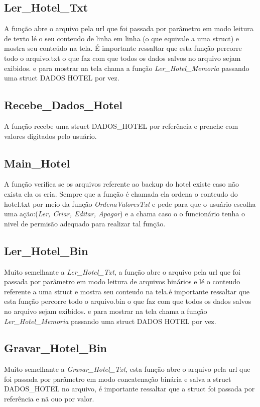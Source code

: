 \documentclass{article}
\begin{document}
\subsection{Ler\_Hotel\_Txt}
	A função abre o arquivo pela url que foi passada por parâmetro em modo leitura de texto lé o seu conteudo de linha em linha (o que equivale a uma struct) e mostra seu conteúdo na tela. É importante ressaltar que esta função percorre todo o arquivo.txt o que faz com que todos os dados salvos no arquivo sejam exibidos. e para mostrar na tela chama a função \textit{Ler\_Hotel\_Memoria} passando uma struct DADOS HOTEL  por vez.

\subsection{Recebe\_Dados\_Hotel}
	A função recebe uma struct  DADOS\_HOTEL por referência e prenche com valores digitados pelo usuário.

\subsection{Main\_Hotel}
	A função verifica se os arquivos referente ao backup do hotel existe caso não exista ela os cria. Sempre que a função é chamada ela ordena o conteudo do hotel.txt por meio da função \textit{OrdenaValoresTxt} e pede para que o usuário escolha uma ação:(\textit{Ler, Criar, Editar, Apagar})  e a chama caso o  o funcionário tenha o nivel de permisão adequado para realizar tal função.

\subsection{Ler\_Hotel\_Bin}
	Muito semelhante a \textit{Ler\_Hotel\_Txt}, a função abre o arquivo pela url que foi passada por parâmetro em modo leitura de arquivos binários e lé o conteudo referente a uma struct e mostra seu conteudo na tela.é importante ressaltar que esta função percorre todo o arquivo.bin o que faz com que todos os dados salvos no arquivo sejam exibidos. e para mostrar na tela chama a função \textit{Ler\_Hotel\_Memoria} passando uma struct DADOS HOTEL  por vez.

\subsection{Gravar\_Hotel\_Bin}
	Muito semelhante a \textit{Gravar\_Hotel\_Txt}, esta função abre o arquivo pela url que foi passada por parâmetro em modo concatenação binária e salva a struct DADOS\_HOTEL  no arquivo, é importante ressaltar que  a struct foi passada por referência e nã ouo por valor.
\end{document}
